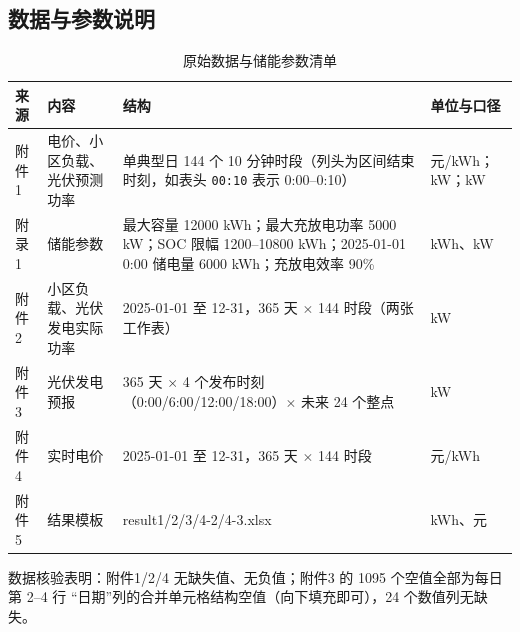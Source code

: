 \subsection{数据与参数说明}

\begin{table}[htbp]
\centering
\caption{原始数据与储能参数清单}
\label{tab:data}
\begin{tabularx}{\textwidth}{@{}p{1.5cm}p{2.4cm}p{6.2cm}X@{}}
\toprule
来源 & 内容 & 结构 & 单位与口径 \\
\midrule
附件1 & 电价\nobreak、小区负载\nobreak、光伏预测功率 & 单典型日 144 个 10 分钟时段（列头为区间结束时刻\nobreak，如表头 \texttt{00:10} 表示 0:00--0:10\nobreak） & 元/kWh\nobreak；kW\nobreak；kW \\
附录1 & 储能参数 & 最大容量 12000 kWh\nobreak；最大充放电功率 5000 kW\nobreak；SOC 限幅 1200--10800 kWh\nobreak；2025-01-01 0:00 储电量 6000 kWh\nobreak；充放电效率 90\% & kWh\nobreak、kW \\
附件2 & 小区负载\nobreak、光伏发电实际功率 & 2025-01-01 至 12-31\nobreak，365 天 $\times$ 144 时段（两张工作表\nobreak） & kW \\
附件3 & 光伏发电预报 & 365 天 $\times$ 4 个发布时刻（0:00/6:00/12:00/18:00\nobreak）$\times$ 未来 24 个整点 & kW \\
附件4 & 实时电价 & 2025-01-01 至 12-31\nobreak，365 天 $\times$ 144 时段 & 元/kWh \\
附件5 & 结果模板 & result1/2/3/4-2/4-3.xlsx & kWh\nobreak、元 \\
\bottomrule
\end{tabularx}
\end{table}

数据核验表明\nobreak：附件1/2/4 无缺失值\nobreak、无负值\nobreak；附件3 的 1095 个空值全部为每日第 2--4 行
“日期\nobreak”列的合并单元格结构空值（向下填充即可\nobreak）\nobreak，24 个数值列无缺失\nobreak。
